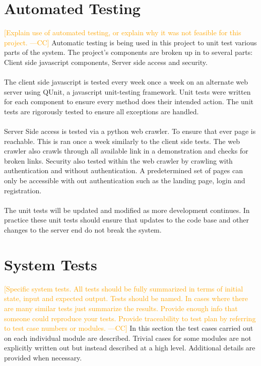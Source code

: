 \documentclass[12pt]{article}
\newcommand{\authornote}[3]{\textcolor{#1}{[#3 ---#2]}}
\newcommand{\authornote}[3]{}
\newcommand{\cc}[1]{\authornote{orange}{CC}{#1}}
\begin{document}
\section{Automated Testing}
\cc{Explain use of automated testing, or explain why it was not feasible for this project.}
Automatic testing is being used in this project to unit test various parts of the system. The project's components are broken up in to several parts: Client side javascript components, Server side access and security.
\\ \\
The client side javascript is tested every week once a week on an alternate web server using QUnit, a javascript unit-testing framework. Unit tests were written for each component to ensure every method does their intended action. The unit tests are rigorously tested to ensure all exceptions are handled.
\\ \\
Server Side access is tested via a python web crawler. To ensure that ever page is reachable. This is ran once a week similarly to the client side tests. The web crawler also crawls through all available link in a demonstration and checks for broken links. Security also tested within the web crawler by crawling with authentication and without authentication. A predetermined set of pages can only be accessible with out authentication such as the landing page, login and registration.
\\ \\
The unit tests will be updated and modified as more development continues. In practice these unit tests should ensure that updates to the code base and other changes to the server end do not break the system.


\section{System Tests}
\cc{Specific system tests.  All tests should be fully summarized in terms of initial state, input and expected output. Tests should be named. In cases where there are many similar tests just summarize the results. Provide enough info that someone could reproduce your tests. Provide traceability to test plan by referring to test case numbers or modules.} In this section the test cases carried out on each individual module are described. Trivial cases for some modules are not explicitly written out but instead described at a high level. Additional details are provided when necessary.
\end{document}
